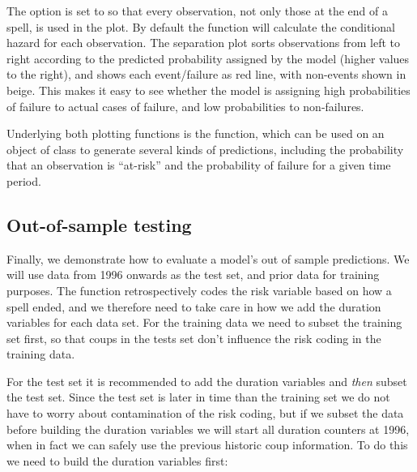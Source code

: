 The option  is set to  so that every
observation, not only those at the end of a spell, is used in the plot.
By default the  function will calculate the conditional
hazard for each observation. The separation plot sorts observations from
left to right according to the predicted probability assigned by the
model (higher values to the right), and shows each event/failure as red
line, with non-events shown in beige. This makes it easy to see whether
the model is assigning high probabilities of failure to actual cases of
failure, and low probabilities to non-failures.

Underlying both plotting functions is the  function, which
can be used on an object of class  to generate several kinds
of predictions, including the probability that an observation is
``at-risk'' and the probability of failure for a given time period.

\subsection{Out-of-sample testing}

Finally, we demonstrate how to evaluate a model's out of sample
predictions. We will use data from 1996 onwards as the test set, and
prior data for training purposes. The  function
retrospectively codes the risk variable based on how a spell ended, and
we therefore need to take care in how we add the duration variables for
each data set. For the training data we need to subset the training set
first, so that coups in the tests set don't influence the risk coding in
the training data.


For the test set it is recommended to add the duration variables and \textit{then} subset the test set. Since the test set is later in time than the training set we do not have to worry about contamination of the risk coding, but if we subset the data before building the duration variables we will start all duration counters at 1996, when in fact we can safely use the previous historic coup information. To do this we need to build the duration variables first:

